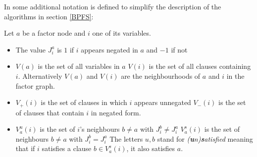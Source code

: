 In \cite{survprob} some additional notation is defined to simplify the description of the algorithms in section \ref{BPFS}: 
\newpage
\begin{definition} Let $a$ be a factor node and $i$ one of its variables.
\begin{itemize}
\item The value $J_i^a$ is $1$ if $i$ appears negated in $a$ and $-1$ if not
\item $V(a)$ is the set of all variables in $a$ \newline$V(i)$ is the set of all clauses containing $i$.  \newline Alternatively $V(a)$ and $V(i)$ are the neighbourhoods of $a$ and $i$ in the factor graph.
\item $V_+(i)$ is the set of clauses  in which $i$ appears unnegated  \newline $V_-(i)$ is the set of clauses that contain $i$ in negated form.
\item $V_a^u(i)$ is the set of $i$'s neighbours $b \neq a$ with $J_i^b \neq J_i^a$ \newline $V_a^s(i)$ is the set of neighbours $b \neq a$ with $J_i^b = J_i^a$\newline
The letters $u, b$ stand for \emph{(\textbf{u}n)\textbf{s}atisfied} meaning that if $i$ satisfies a clause $b \in V_a^s(i)$, it also satisfies $a$.
\end{itemize}
\end{definition}



